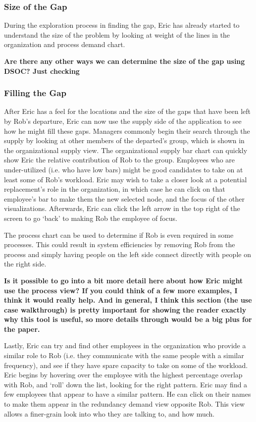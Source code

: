\documentclass[journal]{vgtc}                %
\begin{document}
\subsubsection{Size of the Gap}
During the exploration process in finding the gap, Eric has already started to understand the size of the problem by looking at weight of the lines in the organization and process demand chart. {\textbf{\color{Plum} Are there any other ways we can determine the size of the gap using DSOC? Just checking}

\subsubsection{Filling the Gap}
After Eric has a feel for the locations and the size of the gaps that have been left by Rob's departure, Eric can now use the supply side of the application to see how he might fill these gaps. Managers commonly begin their search through the supply by looking at other members of the departed's group, which is shown in the organizational supply view. The organizational supply bar chart can quickly show Eric the relative contribution of Rob to the group. Employees who are under-utilized (i.e. who have low bars) might be good candidates to take on at least some of Rob's workload. Eric may wish to take a closer look at a potential replacement's role in the organization, in which case he can click on that employee's bar to make them the new selected node, and the focus of the other visualizations. Afterwards, Eric can click the left arrow in the top right of the screen to go \lq back\rq{} to making Rob the employee of focus.

The process chart can be used to determine if Rob is even required in some processes.  This could result in system efficiencies by removing Rob from the process and simply having people on the left side connect directly with people on the right side.{\textbf{\color{Plum} Is it possible to go into a bit more detail here about how Eric might use the process view? If you could think of a few more examples, I think it would really help. And in general, I think this section (the use case walkthrough) is pretty important for showing the reader exactly why this tool is useful, so more details through would be a big plus for the paper.}

Lastly, Eric can try and find other employees in the organization who provide a similar role to Rob (i.e. they communicate with the same people with a similar frequency), and see if they have spare capacity to take on some of the workload.  Eric begins by hovering over the employee with the highest percentage overlap with Rob, and \lq roll\rq{} down the list, looking for the right pattern. Eric may find a few employees that appear to have a similar pattern. He can click on their names to make them appear in the redundancy demand view opposite Rob. This view allows a finer-grain look into who they are talking to, and how much.

}}
\end{document}
